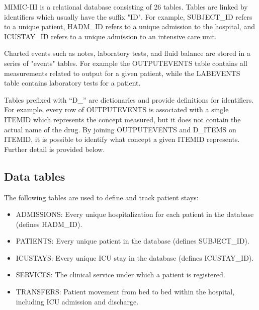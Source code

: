 \documentclass[english]{article}
\begin{document}


MIMIC-III is a relational database consisting of 26 tables. Tables are linked by identifiers which usually have the suffix "ID". For example, SUBJECT\_ID refers to a unique patient, HADM\_ID refers to a unique admission to the hospital, and ICUSTAY\_ID refers to a unique admission to an intensive care unit. 

Charted events such as notes, laboratory tests, and fluid balance are stored in a series of "events" tables. For example the OUTPUTEVENTS table contains all measurements related to output for a given patient, while the LABEVENTS table contains laboratory tests for a patient.

Tables prefixed with “D\_” are dictionaries and provide definitions for identifiers. For example, every row of OUTPUTEVENTS is associated with a single ITEMID which represents the concept measured, but it does not contain the actual name of the drug. By joining OUTPUTEVENTS and D\_ITEMS on ITEMID, it is possible to identify what concept a given ITEMID represents. Further detail is provided below.

\subsection*{Data tables}

The following tables are used to define and track patient stays:

\begin{itemize}
  \item ADMISSIONS: Every unique hospitalization for each patient in the database (defines HADM\_ID).
  \item PATIENTS: Every unique patient in the database (defines SUBJECT\_ID).
  \item ICUSTAYS: Every unique ICU stay in the database (defines ICUSTAY\_ID).
  \item SERVICES: The clinical service under which a patient is registered.
  \item TRANSFERS: Patient movement from bed to bed within the hospital, including ICU admission and discharge.
\end{itemize}
\end{document}
